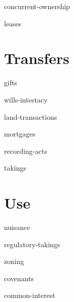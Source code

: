 \documentclass[12pt]{book}
\begin{document}
\module concurrent-ownership

\module leases



\part{Transfers}

\module gifts

\module wills-intestacy

\module land-transactions

\module mortgages

\module recording-acts

%
%

\module takings


\part{Use}

\module nuisance

\module regulatory-takings

\module zoning

\module covenants

\module common-interest
\end{document}
